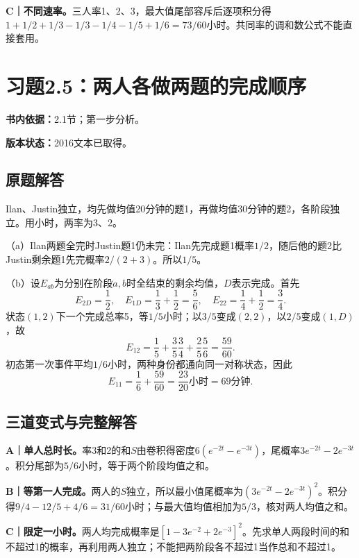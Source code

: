 \documentclass[
  11pt,
  a4paper,
  UTF8,fontset=fandol]{ctexart}
\let\OldSection\section
\renewcommand{\section}{\Needspace{7\baselineskip}\OldSection}
\let\OldSubsection\subsection
\renewcommand{\subsection}{\Needspace{5\baselineskip}\OldSubsection}
\begin{document}
\textbf{C｜不同速率。}三人率1、2、3，最大值尾部容斥后逐项积分得\(1+1/2+1/3-1/3-1/4-1/5+1/6=73/60\)小时。共同率的调和数公式不能直接套用。

\newpage

\section{习题2.5：两人各做两题的完成顺序}\label{ux4e60ux98982.5ux4e24ux4ebaux5404ux505aux4e24ux9898ux7684ux5b8cux6210ux987aux5e8f}

\textbf{书内依据：}2.1节；第一步分析。

\textbf{版本状态：}2016文本已取得。

\subsection{原题解答}\label{ux539fux9898ux89e3ux7b54-4}

Ilan、Justin独立，均先做均值20分钟的题1，再做均值30分钟的题2，各阶段独立。用小时，两率为3、2。

（a）Ilan两题全完时Justin题1仍未完：Ilan先完成题1概率\(1/2\)，随后他的题2比Justin剩余题1先完概率\(2/(2+3)\)。所以\(\boxed{1/5}\)。

（b）设\(E_{ab}\)为分别在阶段\(a,b\)时全结束的剩余均值，\(D\)表示完成。首先
\[E_{2D}=\frac12,\quad E_{1D}=\frac13+\frac12=\frac56,\quad E_{22}=\frac14+\frac12=\frac34.\]
状态\((1,2)\)下一个完成总率5，等\(1/5\)小时；以\(3/5\)变成\((2,2)\)，以\(2/5\)变成\((1,D)\)，故
\[E_{12}=\frac15+\frac35\frac34+\frac25\frac56=\frac{59}{60}.\]
初态第一次事件平均\(1/6\)小时，两种身份都通向同一对称状态，因此
\[\boxed{E_{11}=\frac16+\frac{59}{60}=\frac{23}{20}\text{小时}=69\text{分钟}.}\]

\subsection{三道变式与完整解答}\label{ux4e09ux9053ux53d8ux5f0fux4e0eux5b8cux6574ux89e3ux7b54-4}

\textbf{A｜单人总时长。}率3和2的和\(S\)由卷积得密度\(6(e^{-2t}-e^{-3t})\)，尾概率\(3e^{-2t}-2e^{-3t}\)。积分尾部为\(5/6\)小时，等于两个阶段均值之和。

\textbf{B｜等第一人完成。}两人的\(S\)独立，所以最小值尾概率为\((3e^{-2t}-2e^{-3t})^2\)。积分得\(9/4-12/5+4/6=31/60\)小时；与最大值均值相加为\(5/3\)，核对两人均值之和。

\textbf{C｜限定一小时。}两人均完成概率是\([1-3e^{-2}+2e^{-3}]^2\)。先求单人两段时间的和不超过1的概率，再利用两人独立；不能把两阶段各不超过1当作总和不超过1。
\end{document}
